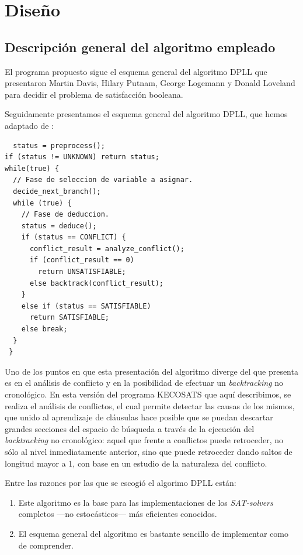 \documentclass[12pt,lettersize,oneside]{article}
\begin{document}
\section{Diseño}

\subsection{Descripción general del algoritmo empleado}
El programa propuesto sigue el esquema general del algoritmo DPLL que presentaron
Martin Davis, Hilary Putnam, George Logemann y Donald Loveland para decidir el
problema de satisfacción booleana.

Seguidamente presentamos el esquema general del algoritmo DPLL, que hemos
adaptado de \cite{Zhang}:

\begin{lstlisting}
  status = preprocess(); 
if (status != UNKNOWN) return status; 
while(true) { 
  // Fase de seleccion de variable a asignar.
  decide_next_branch(); 
  while (true) { 
    // Fase de deduccion.
    status = deduce(); 
    if (status == CONFLICT) { 
      conflict_result = analyze_conflict(); 
      if (conflict_result == 0) 
        return UNSATISFIABLE; 
      else backtrack(conflict_result); 
    } 
    else if (status == SATISFIABLE) 
      return SATISFIABLE; 
    else break; 
  } 
 } 
\end{lstlisting}
\vspace{-2.5mm}

Uno de los puntos en que esta presentación del algoritmo diverge del que
presenta \cite{Zhang} es en el análisis de conflicto y en la posibilidad de
efectuar un \emph{backtracking} no cronológico. En esta versión del programa
KECOSATS que aquí describimos, se realiza el análisis de conflictos, el cual
permite detectar las causas de los mismos, que unido al aprendizaje de cláusulas
hace posible que se puedan descartar grandes secciones del espacio de búsqueda a
través de la ejecución del \emph{backtracking} no cronológico: aquel que frente
a conflictos puede retroceder, no sólo al nivel inmediatamente anterior, sino
que puede retroceder dando saltos de longitud mayor a 1, con base en un estudio
de la naturaleza del conflicto.

Entre las razones por las que se escogió el algorimo DPLL están:
\begin{enumerate}\vspace{-2.5mm}
\item Este algoritmo es la base para las implementaciones de los
  \emph{SAT-solvers} completos ---no estocásticos--- más eficientes conocidos.
\item El esquema general del algoritmo es bastante sencillo de implementar como
  de comprender.
\end{enumerate}
\end{document}
